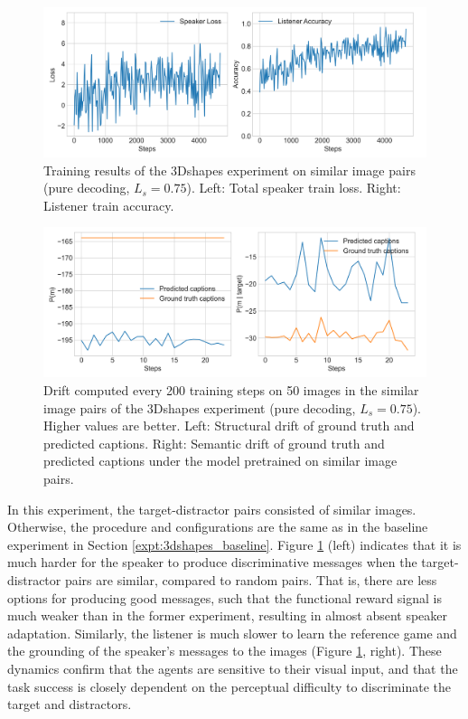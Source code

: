 \begin{figure}
	\centering
	\includegraphics[width=\linewidth]{images/3dshapes_refgame_49_pure_075_similar.png}
	\caption{Training results of the 3Dshapes experiment on similar image pairs (pure decoding, $L_s = 0.75$). Left: Total speaker train loss. Right: Listener train accuracy.}
	\label{fig:3dshapes_similar_075_speaker_loss_listener_acc}
\end{figure}


\begin{figure}
	\centering
	\includegraphics[width=\linewidth]{images/3dshapes_structural_semantic_drift_4000_pure_075_similar.png}
	\caption{Drift computed every 200 training steps on 50 images in the similar image pairs of the 3Dshapes experiment (pure decoding, $L_s = 0.75$). Higher values are better. Left: Structural drift of ground truth and predicted captions. Right: Semantic drift of ground truth and predicted captions under the model pretrained on similar image pairs.} 
	\label{fig:3dshapes_similar_075_str_sem_drift}
\end{figure}

In this experiment, the target-distractor pairs consisted of similar images. Otherwise, the procedure and configurations are the same as in the baseline experiment in Section \ref{expt:3dshapes_baseline}. 
Figure \ref{fig:3dshapes_similar_075_speaker_loss_listener_acc} (left) indicates that it is much harder for the speaker to produce discriminative messages when the target-distractor pairs are similar, compared to random pairs. That is, there are less options for producing good messages, such that the functional reward signal is much weaker than in the former experiment, resulting in almost absent speaker adaptation. Similarly, the listener is much slower to learn the reference game and the grounding of the speaker's messages to the images (Figure \ref{fig:3dshapes_similar_075_speaker_loss_listener_acc}, right). These dynamics confirm that the agents are sensitive to their visual input, and that the task success is closely dependent on the perceptual difficulty to discriminate the target and distractors.

